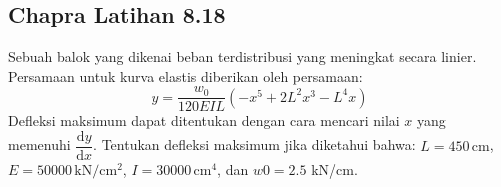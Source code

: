 \subsection{Chapra Latihan 8.18}
Sebuah balok yang dikenai beban terdistribusi yang meningkat secara linier.
Persamaan untuk kurva elastis diberikan oleh persamaan:
\begin{equation*}
y = \frac{w_0}{120EIL}
\left( -x^5 + 2L^2 x^3 - L^4 x \right)
\end{equation*}
Defleksi maksimum dapat ditentukan dengan cara mencari nilai $x$ yang
memenuhi $\dfrac{\mathrm{d}y}{\mathrm{d}x}$.
Tentukan defleksi maksimum jika diketahui bahwa:
$L = 450\, \mathrm{cm}$,
$E = 50000 \, \mathrm{kN}/\mathrm{cm}^2$,
$I = 30000 \, \mathrm{cm}^4$,
dan $w0 = 2.5$ kN/cm.
